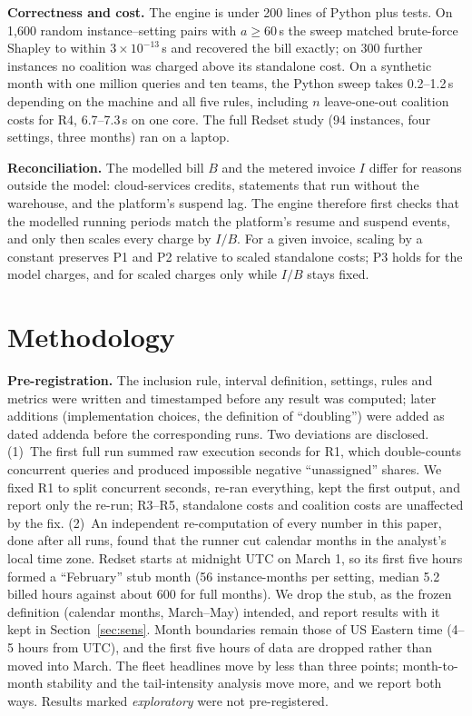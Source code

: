\documentclass[sigconf]{acmart}
\begin{document}
\textbf{Correctness and cost.} The engine is under 200 lines of Python plus tests. On 1,600 random instance--setting pairs
with $a \ge 60$\,s the sweep matched brute-force Shapley to within $3\times10^{-13}$\,s and recovered the bill exactly; on 300
further instances no coalition was charged above its standalone cost. On a synthetic month with one million queries and ten
teams, the Python sweep takes 0.2--1.2\,s depending on the machine and all five rules, including $n$ leave-one-out coalition costs for R4, 6.7--7.3\,s
on one core. The full Redset study (94 instances, four settings, three months) ran on a laptop.

\textbf{Reconciliation.} The modelled bill $B$ and the metered invoice $I$ differ for reasons outside the model: cloud-services
credits, statements that run without the warehouse, and the platform's suspend lag. The engine therefore first checks that
the modelled running periods match the platform's resume and suspend events, and only then scales every charge by $I/B$.
For a given invoice, scaling by a constant preserves P1 and P2 relative to scaled standalone costs; P3 holds for the model
charges, and for scaled charges only while $I/B$ stays fixed.

\section{Methodology}\label{sec:method}
\textbf{Pre-registration.} The inclusion rule, interval definition, settings, rules and metrics were written and timestamped
before any result was computed; later additions (implementation choices, the definition of ``doubling'') were added as dated
addenda before the corresponding runs. Two deviations are disclosed.
(1)~The first full run summed raw execution seconds for R1, which double-counts concurrent queries and produced impossible
negative ``unassigned'' shares. We fixed R1 to split concurrent seconds, re-ran everything, kept the first output, and report
only the re-run; R3--R5, standalone costs and coalition costs are unaffected by the fix.
(2)~An independent re-computation of every number in this paper, done after all runs, found that the runner cut calendar
months in the analyst's local time zone. Redset starts at midnight UTC on March 1, so its first five hours formed a
``February'' stub month (56 instance-months per setting, median 5.2 billed hours against about 600 for full months). We drop
the stub, as the frozen definition (calendar months, March--May) intended, and report results with it kept in
Section~\ref{sec:sens}. Month boundaries remain those of US Eastern time (4--5 hours from UTC), and the first five hours of
data are dropped rather than moved into March. The fleet headlines move by less than three points; month-to-month stability
and the tail-intensity analysis move more, and we report both ways. Results marked \emph{exploratory} were not pre-registered.
\end{document}
